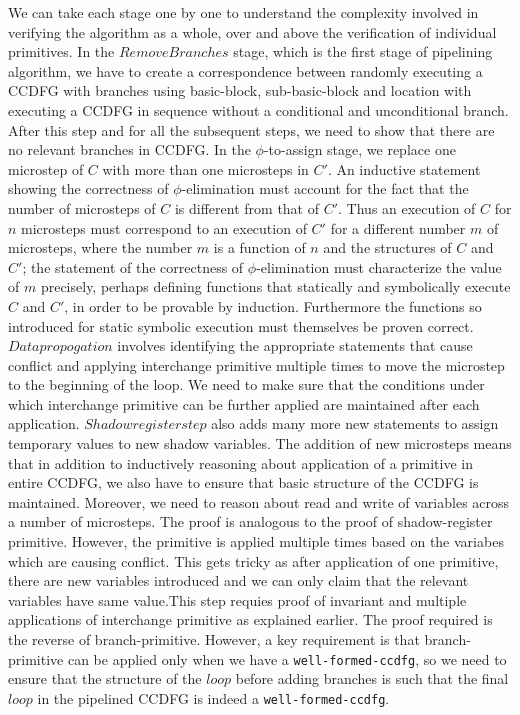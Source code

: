 We can take each stage one by one to understand the complexity involved in 
verifying the algorithm as a whole, over and above the verification of 
individual primitives. In the $Remove Branches$ stage, which is the first stage of pipelining algorithm, 
we have to create a correspondence between randomly executing a CCDFG with branches using basic-block, 
sub-basic-block and location with executing a CCDFG in sequence without a conditional and unconditional branch. 
After this step and for all the subsequent steps, we need to show that there are no relevant branches in CCDFG. 
In the $\phi$-to-assign stage, we replace one microstep of $C$ with more than one microsteps in $C'$. 
An inductive statement showing the correctness of $\phi$-elimination must account for the fact
that the number of microsteps of $C$ is different from that
of $C'$.  Thus an execution of $C$ for $n$ microsteps must
correspond to an execution of $C'$ for a different number
$m$ of microsteps, where the number $m$ is a function of $n$
and the structures of $C$ and $C'$; the statement of the
correctness of $\phi$-elimination must characterize the
value of $m$ precisely, perhaps defining functions that
statically and symbolically execute $C$ and $C'$, in order
to be provable by induction.  Furthermore the functions so
introduced for static symbolic execution must themselves be
proven correct. $Data propogation$ involves identifying 
the appropriate statements that cause conflict and applying 
interchange primitive multiple times 
to move the microstep to the beginning of the loop. 
We need to make sure that the conditions under which
interchange primitive can be further applied are maintained after each application. 
$Shadow register step$ also adds many more new statements to assign temporary values to 
new shadow variables. The addition of new microsteps means that in addition to 
inductively reasoning about application of a primitive in entire CCDFG, we also have to 
ensure that basic structure of the CCDFG is maintained. Moreover, we need to reason about read and write of 
variables across a number of microsteps. The proof is analogous to the proof of shadow-register primitive. 
However, the primitive is applied multiple times based on the variabes which are causing conflict. 
This gets tricky as after application of one primitive, there are new variables introduced and 
we can only claim that the relevant variables have same value.This step requies proof of invariant and multiple applications of interchange primitive as explained earlier. The proof required is the reverse of branch-primitive. However, a key requirement is that branch-primitive can be applied only when we have a {\tt well-formed-ccdfg}, so we need to ensure that the structure of the $loop$ before adding 
branches is such that the final $loop$ in the pipelined CCDFG is indeed a {\tt well-formed-ccdfg}.  

